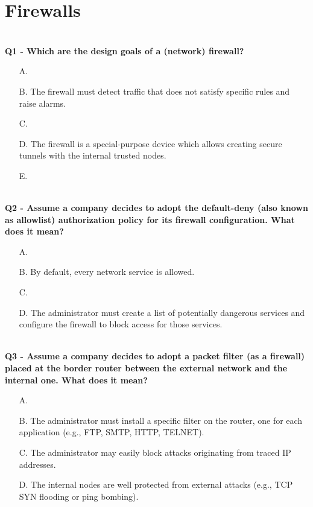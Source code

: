 \section{Firewalls}

\textbf{\\Q1 - Which are the design goals of a (network) firewall?}
\begin{itemize}
    \item[A.] 
    \item[B.] The firewall must detect traffic that does not satisfy specific rules and raise alarms.
    \item[C.] 
    \item[D.] The firewall is a special-purpose device which allows creating secure tunnels with the internal trusted nodes.
    \item[E.] 
\end{itemize}

\textbf{\\Q2 - Assume a company decides to adopt the default-deny (also known as allowlist) authorization policy for its firewall configuration. What does it mean?}
\begin{itemize}
    \item[A.] 
    \item[B.] By default, every network service is allowed.
    \item[C.] 
    \item[D.] The administrator must create a list of potentially dangerous services and configure the firewall to block access for those services.
\end{itemize}

\textbf{\\Q3 - Assume a company decides to adopt a packet filter (as a firewall) placed at the border router between the external network and the internal one. What does it mean?}
\begin{itemize}
    \item[A.] 
    \item[B.] The administrator must install a specific filter on the router, one for each application (e.g., FTP, SMTP, HTTP, TELNET).
    \item[C.] The administrator may easily block attacks originating from traced IP addresses.
    \item[D.] The internal nodes are well protected from external attacks (e.g., TCP SYN flooding or ping bombing).
\end{itemize}

